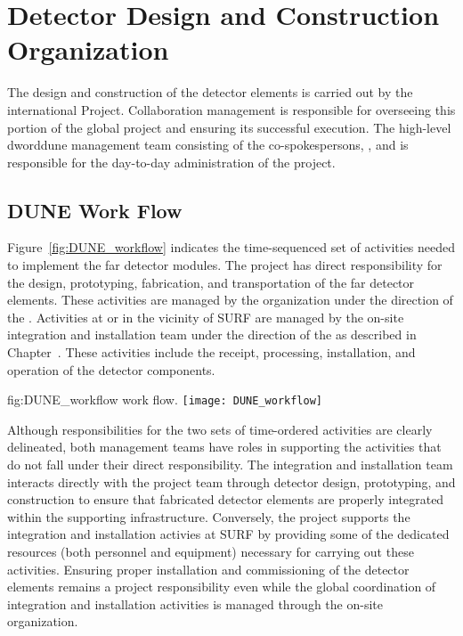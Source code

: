 ﻿\chapter{Detector Design and Construction Organization}
\label{vl:tc-overview}

The design and construction of the  detector elements is 
carried out by the international  Project.  
Collaboration management is responsible for overseeing this portion 
of the global project and ensuring its successful execution.  
The high-level dword{dune} management team consisting of the 
co-spokespersons, , and  is responsible 
for the day-to-day administration of the project.  

\section{DUNE Work Flow}
\label{sec:workflow}

Figure~\ref{fig:DUNE_workflow} indicates the time-sequenced set of 
activities needed to implement the  far detector modules.
The  project has direct responsibility for the design, 
prototyping, fabrication, and transportation of the far detector 
elements.  These activities are managed by the   
organization under the direction of the .  Activities at 
or in the vicinity of SURF are managed by the on-site integration and
installation team under the direction of the  as described 
in Chapter~\label{ch:tc-jpo}.  These activities include the receipt,
processing, installation, and operation of the detector components.            
\begin{dunefigure}{fig:DUNE_workflow}
  { work flow.}
  \texttt{[image: DUNE\_workflow]}
\end{dunefigure}

Although responsibilities for the two sets of time-ordered activities 
are clearly delineated, both management teams have roles in supporting
the activities that do not fall under their direct responsibility.  The 
integration and installation team interacts directly with the  
project team through detector design, prototyping, and construction to 
ensure that fabricated detector elements are properly integrated within 
the supporting infrastructure.  Conversely, the  project 
supports the integration and installation activies at SURF by providing 
some of the dedicated resources (both personnel and equipment) necessary 
for carrying out these activities.  Ensuring proper installation and 
commissioning of the detector elements remains a  project
responsibility even while the global coordination of integration and 
installation activities is managed through the on-site organization.  

